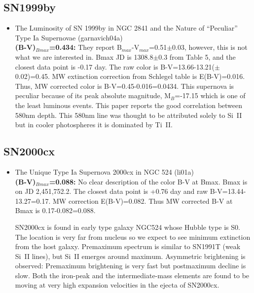 \subsection{SN1999by}
\begin{itemize}
\item  The Luminosity of SN 1999by in NGC 2841 and the Nature of ``Peculiar'' Type Ia Supernovae
(garnavich04a) \citet{garnavich04a} \\
{\bf (B-V)$_{Bmax}$=0.434:} 
They report B$_{max}$-V$_{max}$=0.51$\pm$0.03, however, this is not what we are interested in.
Bmax JD is 1308.8$\pm$0.3 from Table 5, and the closest data point is -0.17 day.  The
raw color is B-V=13.66-13.21($\pm$0.02)=0.45.  MW extinction correction from Schlegel table
is E(B-V)=0.016.  Thus, MW corrected color is B-V=0.45-0.016=0.0434.
This supernova is peculiar because of its peak absolute magnitude, M$_{B}$=-17.15 which is
one of the least luminous events.  This paper reports the good correlation between
580nm depth.  This 580nm line was thought to be attributed solely to Si~II but in cooler
photospheres it is dominated by Ti~II.
\end{itemize}

\subsection{\bf SN2000cx}
\begin{itemize}
\item The Unique Type Ia Supernova 2000cx in NGC 524 (li01a) \citet{li01a}\\
{\bf (B-V)$_{Bmax}$=0.088:} 
No clear description of the color B-V at Bmax.
Bmax is on JD 2,451,752.2.  The closest data point is +0.76 day and raw
B-V=13.44-13.27=0.17.  MW correction E(B-V)=0.082.  Thus MW corrected 
B-V at Bmax is 0.17-0.082=0.088.  

SN2000cx is found in early type galaxy NGC524 whose Hubble type is S0.
The location is very far from nucleus so we expect to see minimum extinction
from the host galaxy.
Premaximum spectrum is similar to SN1991T (weak Si~II lines), but Si~II emerges
around maximum.   Asymmetric brightening is observed: Premaximum brightening is 
very fast but postmaximum decline is slow. 
Both the iron-peak and the intermediate-mass elements are found to be moving
at very high expansion velocities in the ejecta of SN2000cx.

\end{itemize}
